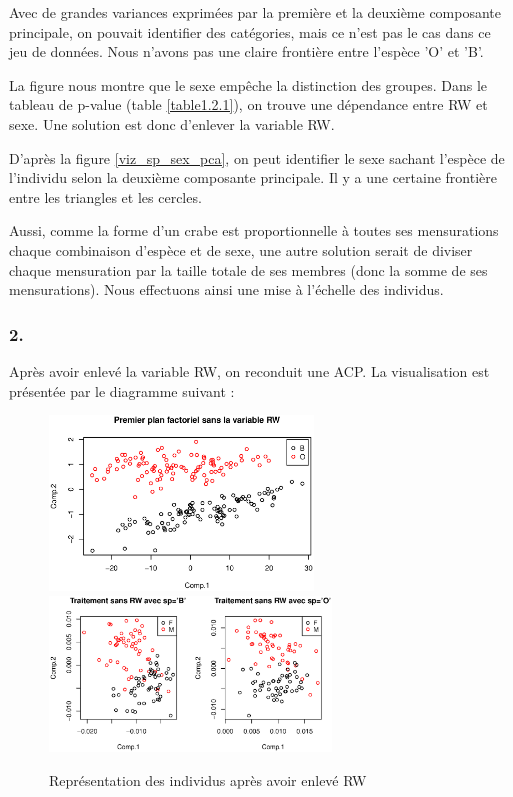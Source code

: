 \documentclass{article}
\begin{document}
Avec de grandes variances exprimées par la première et la deuxième composante principale, on pouvait identifier des catégories, mais ce n'est pas le cas dans ce jeu de données. Nous n'avons pas une claire frontière entre l'espèce 'O' et 'B'. 

La figure nous montre que le sexe empêche la distinction des groupes. Dans le tableau de p-value (table \ref{table1.2.1}), on trouve une dépendance entre RW et sexe. Une solution est donc d'enlever la variable RW.

D'après la figure \ref{viz_sp_sex_pca}, on peut identifier le sexe sachant l'espèce de l'individu selon la deuxième composante principale. Il y a une certaine frontière entre les triangles et les cercles.

Aussi, comme la forme d'un crabe est proportionnelle à toutes ses mensurations chaque combinaison d'espèce et de sexe, une autre solution serait de diviser chaque mensuration par la taille totale de ses membres (donc la somme de ses mensurations). Nous effectuons ainsi une mise à l'échelle des individus.


\subsubsection*{2.}
Après avoir enlevé la variable RW, on reconduit une ACP. La visualisation est présentée par le diagramme suivant :

\begin{figure}[H]
\centering
\includegraphics[width=7cm]{./img/2-3_premier_plan_no_rw.eps}
\includegraphics[width=7.5cm]{./img/2-3_premier_plan_no_rw_sp.eps}
\caption{Représentation des individus après avoir enlevé RW}
\label{viz_sp_sans_rw}
\end{figure}
\end{document}
